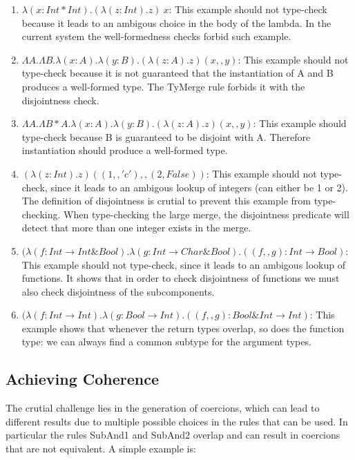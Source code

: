 \documentclass[preprint]{sigplanconf}
\begin{document}
\begin{enumerate}

\item $\lambda (x : Int * Int). (\lambda (z : Int) . z)~x$: This
  example should not type-check because it leads to an ambigous choice
  in the body of the lambda. In the current system the well-formedness
  checks forbid such example.

\item $\Lambda A.\Lambda B.\lambda (x:A).\lambda (y:B). (\lambda (z:A)
  . z) (x,,y)$: This example should not type-check because it is not
  guaranteed that the instantiation of A and B produces a well-formed
  type. The TyMerge rule forbids it with the disjointness check.

\item $\Lambda A.\Lambda B * A.\lambda (x:A).\lambda (y:B). (\lambda
  (z:A) . z) (x,,y)$: This example should type-check because B is
  guaranteed to be disjoint with A. Therefore instantiation should
  produce a well-formed type.

\item $(\lambda (z:Int) . z) ((1,,'c'),,(2,False))$: This example
  should not type-check, since it leads to an ambigous lookup of
  integers (can either be 1 or 2). The definition of disjointness is
  crutial to prevent this example from type-checking. When
  type-checking the large merge, the disjointness predicate will
  detect that more than one integer exists in the merge.

\item $(\lambda (f: Int \to Int \& Bool) . \lambda (g : Int \to Char \& Bool) . ((f,,g) : Int \to Bool)$:
  This example
  should not type-check, since it leads to an ambigous lookup of
  functions. It shows that in order to check disjointness
  of functions we must also check disjointness of the subcomponents.

\item $(\lambda (f: Int \to Int) . \lambda (g : Bool \to Int) . ((f,,g) : Bool \& Int \to Int)$:
  This example shows that whenever the return types overlap, so does the function type:
  we can always find a common subtype for the argument types.
\end{enumerate}

\subsection{Achieving Coherence}

The crutial challenge lies in the generation of coercions, which can lead
to different results due to multiple possible choices in the rules that
can be used. In particular the rules SubAnd1 and SubAnd2 overlap and
can result in coercions that are not equivalent. A simple example is:
\end{document}
